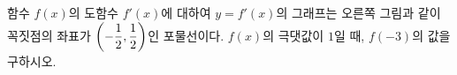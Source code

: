 \noindent\begin{minipage}[t]{0.58\linewidth}\vspace{0pt}\raggedright 함수 $f(x)$의 도함수 $f'(x)$에 대하여 $y=f'(x)$의 그래프는 오른쪽 그림과 같이 꼭짓점의 좌표가 $\left(-\dfrac{1}{2}{,}\mkern3mu\mathopen{}\dfrac{1}{2}\right)$인 포물선이다. $f(x)$의 극댓값이 $1$일 때, $f(-3)$의 값을 구하시오.\end{minipage}\hfill\begin{minipage}[t]{0.4\linewidth}\vspace{0pt}\centering \resizebox{\ifdim\width>\linewidth\linewidth\else\width\fi}{!}{}\end{minipage}\par
